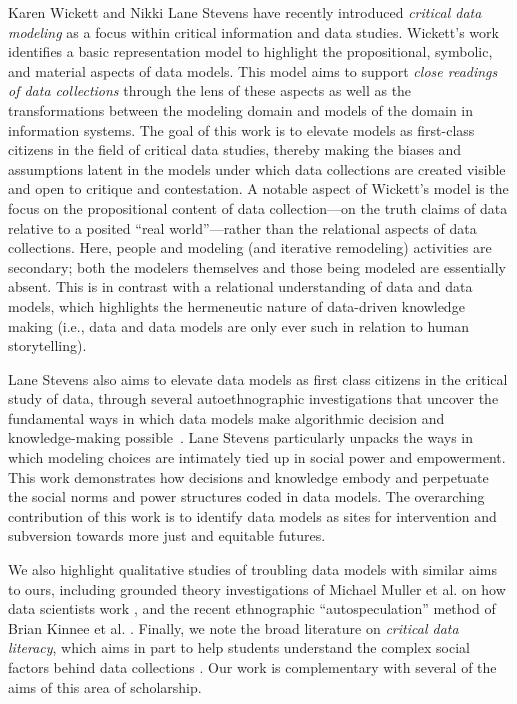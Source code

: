 Karen Wickett and Nikki Lane Stevens have recently introduced \emph{critical data modeling} as a focus within critical information and data studies.
Wickett's work \cite{wickett} identifies a basic representation model to highlight the propositional, symbolic, and material aspects of data models. This model aims to support \emph{close readings of data collections} through the lens of these aspects as well as the transformations between the modeling domain and models of the domain in information systems.  The goal of this work is to elevate models as first-class citizens in the field of critical data studies, thereby making the biases and assumptions latent in the models under which data collections are created visible and open to critique and contestation.  A notable aspect of Wickett's model is 
the focus on the propositional content of data collection---on the truth claims of data relative to a posited ``real world''---rather than the relational aspects of data collections.  Here, people and modeling (and iterative remodeling) activities are secondary; both the modelers themselves and those being modeled are essentially absent.  This is in contrast with a relational understanding of data and data models, which highlights the hermeneutic nature of data-driven knowledge making (i.e., data and data models are only ever such in relation to human storytelling).

Lane Stevens also aims to elevate data models as first class citizens in the critical study of data, through several autoethnographic investigations that uncover the fundamental ways in which data models make algorithmic decision and knowledge-making possible~\cite{stevens}. Lane Stevens particularly unpacks the ways in which modeling choices are intimately tied up in social power and empowerment.  This work demonstrates how decisions and knowledge embody and perpetuate the social norms and power structures coded in data models.  The overarching contribution of this work is to identify data models as sites for intervention and subversion towards more just and equitable futures.  

We also highlight qualitative studies of troubling data models with similar aims to ours, including grounded theory investigations of Michael Muller et al. on how data scientists work \cite{muller}, and the recent ethnographic ``autospeculation'' method of Brian Kinnee et al. \cite{kinnee}.  
Finally, we note the broad literature on \emph{critical data literacy}, which aims in part to help students understand the complex social factors behind data collections  
\cite{dangol}.  Our work is complementary with several of the aims of this area of scholarship.



